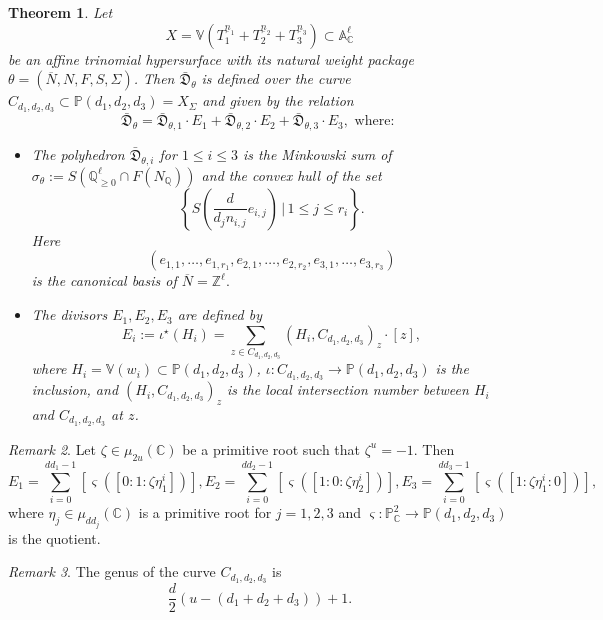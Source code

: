 \documentclass[11pt, reqno]{amsart}
\theoremstyle{plain}
\newtheorem{theorem}{Theorem}[section]
\theoremstyle{definition}
\theoremstyle{remark}
\newtheorem{remark}[theorem]{Remark}
\begin{document}
\begin{theorem}\cite[Theorem 3.1]{Kru19}\label{Kruglov-Theorem}
Let $$X  =  \mathbb{V}(T_{1}^{\underline{n}_{1}} + T_{2}^{\underline{n}_{2}} + T_{3}^{\underline{n}_{3}}) \subset \mathbb{A}_{\mathbb{C}}^{\ell}$$
be an affine trinomial hypersurface with its natural weight package $\theta =  (\overline{N}, N, F, S, \Sigma)$.
Then $\bar{\mathfrak{D}}_{\theta}$ is defined over the curve
$C_{d_{1}, d_{2}, d_{3}}\subset \mathbb{P}(d_{1}, d_{2}, d_{3}) =  X_{\Sigma}$ and given by the relation
$$\bar{\mathfrak{D}}_{\theta} =  \bar{\mathfrak{D}}_{\theta, 1}\cdot E_{1} + \bar{\mathfrak{D}}_{\theta, 2}\cdot E_{2} + \bar{\mathfrak{D}}_{\theta, 3}\cdot E_{3}  , \text{ where: }$$
\begin{itemize}
\item[$(i)$] The polyhedron $\bar{\mathfrak{D}}_{\theta, i}$ for $1\leq i\leq 3$ is the Minkowski sum of 
$\sigma_{\theta}:= S(\mathbb{Q}_{\geq 0}^{\ell}\cap F(N_{\mathbb{Q}}))$ and the convex hull of the set
$$\left\{ S\left( \frac{d}{d_{j} n_{i,j}}e_{i,j}\right)\,|\, 1\leq j\leq r_{i}\right\}.$$
Here 
$$(e_{1,1}, \ldots, e_{1, r_{1}}, e_{2, 1}, \ldots, e_{2, r_{2}}, e_{3,1}, \ldots, e_{3, r_{3}})$$
is the canonical basis of $\overline{N} =  \mathbb{Z}^{\ell}.$
\item[$(ii)$] The divisors $E_{1}, E_{2}, E_{3}$ are defined by
$$E_{i}:= \iota^{\star}(H_{i})  =  \sum_{z\in C_{d_{1}, d_{2}, d_{3}}}(H_{i}, C_{d_{1}, d_{2}, d_{3}})_{z}\cdot [z],$$
where $H_{i} =  \mathbb{V}(w_{i})\subset \mathbb{P}(d_{1}, d_{2}, d_{3})$,
$\iota:  C_{d_{1}, d_{2}, d_{3}}\rightarrow  \mathbb{P}(d_{1}, d_{2}, d_{3})$ is the inclusion, and $(H_{i}, C_{d_{1}, d_{2}, d_{3}})_{z}$ is the local intersection number between $H_{i}$ and $C_{d_{1}, d_{2}, d_{3}}$ at $z$. 
\end{itemize}
\end{theorem}
\begin{remark} \cite[Remark 4.1]{Kru19}
Let $\zeta\in \mu_{2u}(\mathbb{C})$ be a primitive root such that $\zeta^{u} = -1$. Then 
$$E_{1} =  \sum_{i = 0}^{dd_{1}-1} [\varsigma([0:1: \zeta \eta_{1}^{i}])],E_{2} =  \sum_{i = 0}^{dd_{2}-1} [\varsigma([1:0: \zeta \eta_{2}^{i}])],E_{3} =  \sum_{i = 0}^{dd_{3}-1} [\varsigma([1: \zeta \eta_{1}^{i}: 0])],$$
where $\eta_{j}\in\mu_{dd_j}(\mathbb{C})$ is a primitive root for $j= 1,2,3$ and $\varsigma: \mathbb{P}^{2}_{\mathbb{C}}\rightarrow \mathbb{P}(d_{1}, d_{2}, d_{3})$ is the quotient.
\end{remark}
\begin{remark} \cite[Remark 4.2]{Kru19}
The genus of the curve 
$C_{d_{1},d_{2}, d_{3}}$ is $$\frac{d}{2}(u - (d_{1} + d_{2} + d_{3})) + 1.$$
\end{remark}
\end{document}
